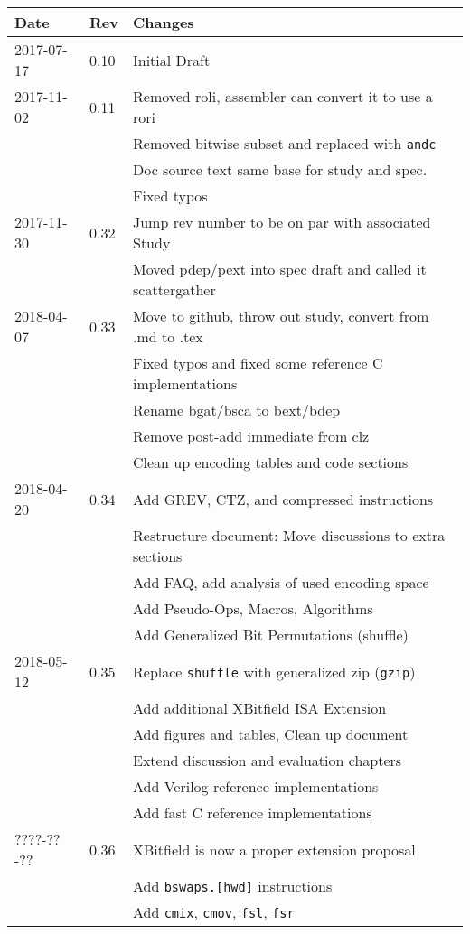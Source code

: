 \documentclass[twoside,11pt]{book}
\begin{document}
\begin{center}
\begin{tabular}{lll}
Date & Rev & Changes \\
\hline
2017-07-17 & 0.10 & Initial Draft \\
2017-11-02 & 0.11 & Removed roli, assembler can convert it to use a rori \\
           &      & Removed bitwise subset and replaced with \texttt{andc} \\
           &      & Doc source text same base for study and spec. \\
           &      & Fixed typos \\
2017-11-30 & 0.32 & Jump rev number to be on par with associated Study \\
           &      & Moved pdep/pext into spec draft and called it scattergather \\
2018-04-07 & 0.33 & Move to github, throw out study, convert from .md to .tex \\
           &      & Fixed typos and fixed some reference C implementations \\
           &      & Rename bgat/bsca to bext/bdep \\
           &      & Remove post-add immediate from clz \\
           &      & Clean up encoding tables and code sections \\
2018-04-20 & 0.34 & Add GREV, CTZ, and compressed instructions \\
           &      & Restructure document: Move discussions to extra sections \\
           &      & Add FAQ, add analysis of used encoding space \\
           &      & Add Pseudo-Ops, Macros, Algorithms \\
           &      & Add Generalized Bit Permutations (shuffle) \\
2018-05-12 & 0.35 & Replace {\tt shuffle} with generalized zip ({\tt gzip}) \\
           &      & Add additional XBitfield ISA Extension \\
           &      & Add figures and tables, Clean up document \\
           &      & Extend discussion and evaluation chapters \\
           &      & Add Verilog reference implementations \\
           &      & Add fast C reference implementations \\
????-??-?? & 0.36 & XBitfield is now a proper extension proposal \\
           &      & Add {\tt bswaps.[hwd]} instructions \\
           &      & Add {\tt cmix}, {\tt cmov}, {\tt fsl}, {\tt fsr} \\
\end{tabular}
\end{center}



\end{document}
